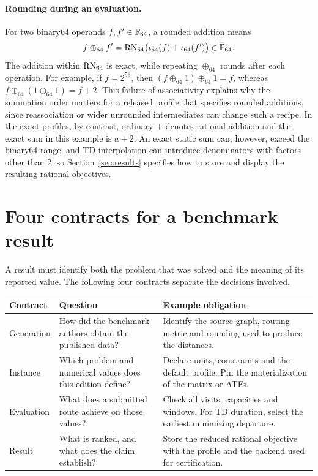 \paragraph{Rounding during an evaluation.}
For two binary64 operands $f,f'\in\mathbb{F}_{64}$, a rounded addition means
\begin{equation}\label{eq:binary64-addition}
f\oplus_{64} f'=\operatorname{RN}_{64}\bigl(\iota_{64}(f)+\iota_{64}(f')\bigr)\in\overline{\mathbb{F}}_{64} .
\end{equation}
The addition within $\operatorname{RN}_{64}$ is exact, while repeating $\oplus_{64}$ rounds after each operation. For example, if $f=2^{53}$, then $(f\oplus_{64}1)\oplus_{64}1=f$, whereas $f\oplus_{64}(1\oplus_{64}1)=f+2$. This \href{https://en.wikipedia.org/wiki/Associative_property#Nonassociativity_of_floating-point_calculation}{failure of associativity} explains why the summation order matters for a released profile that specifies rounded additions, since reassociation or wider unrounded intermediates can change such a recipe. In the exact profiles, by contrast, ordinary $+$ denotes rational addition and the exact sum in this example is $a+2$. An exact static sum can, however, exceed the binary64 range, and TD interpolation can introduce denominators with factors other than 2, so Section~\ref{sec:results} specifies how to store and display the resulting rational objectives.

\section{Four contracts for a benchmark result}\label{sec:layers}

A result must identify both the problem that was solved and the meaning of its reported value. The following four contracts separate the decisions involved.

\begin{center}
\begin{tabularx}{\linewidth}{@{}lXX@{}}
\toprule
Contract & Question & Example obligation\\
\midrule
Generation & How did the benchmark authors obtain the published data? & Identify the source graph, routing metric and rounding used to produce the distances.\\
Instance & Which problem and numerical values does this edition define? & Declare units, constraints and the default profile. Pin the materialization of the matrix or ATFs.\\
Evaluation & What does a submitted route achieve on those values? & Check all visits, capacities and windows. For TD duration, select the earliest minimizing departure.\\
Result & What is ranked, and what does the claim establish? & Store the reduced rational objective with the profile and the backend used for certification.\\
\bottomrule
\end{tabularx}
\end{center}

